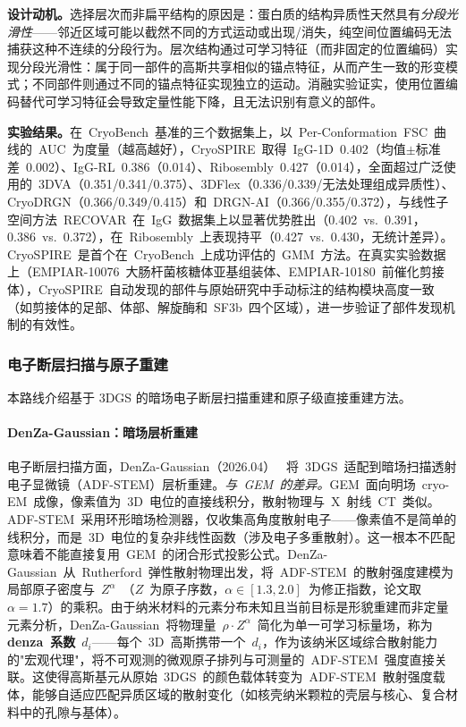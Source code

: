 \textbf{设计动机。}选择层次而非扁平结构的原因是：蛋白质的结构异质性天然具有\textit{分段光滑性}——邻近区域可能以截然不同的方式运动或出现/消失，纯空间位置编码无法捕获这种不连续的分段行为。层次结构通过可学习特征（而非固定的位置编码）实现分段光滑性：属于同一部件的高斯共享相似的锚点特征，从而产生一致的形变模式；不同部件则通过不同的锚点特征实现独立的运动。消融实验证实，使用位置编码替代可学习特征会导致定量性能下降，且无法识别有意义的部件。

\textbf{实验结果。}在~CryoBench~基准的三个数据集上，以~Per-Conformation~FSC~曲线的~AUC~为度量（越高越好），CryoSPIRE~取得~IgG-1D~0.402（均值$\pm$标准差~0.002）、IgG-RL~0.386（0.014）、Ribosembly~0.427（0.014），全面超过广泛使用的~3DVA（0.351/0.341/0.375）、3DFlex（0.336/0.339/无法处理组成异质性）、CryoDRGN（0.366/0.349/0.415）和~DRGN-AI（0.366/0.355/0.372），与线性子空间方法~RECOVAR~在~IgG~数据集上以显著优势胜出（0.402~vs.~0.391，0.386~vs.~0.372），在~Ribosembly~上表现持平（0.427~vs.~0.430，无统计差异）。CryoSPIRE~是首个在~CryoBench~上成功评估的~GMM~方法。在真实实验数据上（EMPIAR-10076~大肠杆菌核糖体亚基组装体、EMPIAR-10180~前催化剪接体），CryoSPIRE~自动发现的部件与原始研究中手动标注的结构模块高度一致（如剪接体的足部、体部、解旋酶和~SF3b~四个区域），进一步验证了部件发现机制的有效性。

\subsubsection{电子断层扫描与原子重建}

本路线介绍基于 3DGS 的暗场电子断层扫描重建和原子级直接重建方法。

\paragraph{DenZa-Gaussian：暗场层析重建}

电子断层扫描方面，DenZa-Gaussian（2026.04）~\cite{2604_04693} 将~3DGS~适配到暗场扫描透射电子显微镜（ADF-STEM）层析重建。\textit{与~GEM~的差异。}GEM~面向明场~cryo-EM~成像，像素值为~3D~电位的直接线积分，散射物理与~X~射线~CT~类似。ADF-STEM~采用环形暗场检测器，仅收集高角度散射电子——像素值不是简单的线积分，而是~3D~电位的复杂非线性函数（涉及电子多重散射）。这一根本不匹配意味着不能直接复用~GEM~的闭合形式投影公式。DenZa-Gaussian~从~Rutherford~弹性散射物理出发，将~ADF-STEM~的散射强度建模为局部原子密度与~$Z^\alpha$~（$Z$~为原子序数，$\alpha \in [1.3, 2.0]$~为修正指数，论文取~$\alpha = 1.7$）的乘积。由于纳米材料的元素分布未知且当前目标是形貌重建而非定量元素分析，DenZa-Gaussian~将物理量~$\rho \cdot Z^\alpha$~简化为单一可学习标量场，称为\textbf{denza~系数}~$d_i$——每个~3D~高斯携带一个~$d_i$，作为该纳米区域综合散射能力的"宏观代理"，将不可观测的微观原子排列与可测量的~ADF-STEM~强度直接关联。这使得高斯基元从原始~3DGS~的颜色载体转变为~ADF-STEM~散射强度载体，能够自适应匹配异质区域的散射变化（如核壳纳米颗粒的壳层与核心、复合材料中的孔隙与基体）。

